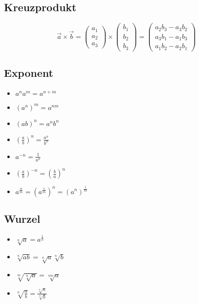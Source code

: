 \subsection{Kreuzprodukt}
{\footnotesize
\[
\vec{a} \times \vec{b} = \left ( \begin{array}{c} a_1 \\ a_2 \\ a_3 \end{array}
\right ) \times
\left ( \begin{array}{c} b_1 \\ b_2 \\ b_3 \end{array}
\right ) =
\left ( \begin{array}{c} a_2b_3 - a_3b_2 \\ a_3b_1 - a_1b_3 \\ a_1b_2 - a_2b_1
\end{array} \right )
\]
}

\begin{multicols}{2}
\subsection{Exponent}
\begin{itemize}[leftmargin=*]
  \item $a^n a^m = a^{n + m}$
  \item $(a^n)^m = a^{nm}$
  \item $(ab)^n = a^n b^n$
  \item $\left( \frac{a}{b} \right)^n = \frac{a^n}{b^n}$
  \item $a^{-n} = \frac{1}{a^n}$
  \item $\left( \frac{a}{b} \right)^{-n} = \left( \frac{b}{a} \right)^n$
  \item $a^\frac{n}{m} = (a^\frac{1}{m})^n = (a^n)^\frac{1}{m}$
\end{itemize}
\columnbreak

\subsection{Wurzel}
\begin{itemize}[leftmargin=*]
  \item $\sqrt[n]{a} = a^\frac{1}{n}$
  \item $\sqrt[n]{ab} = \sqrt[n]{a} \sqrt[n]{b}$
  \item $\sqrt[m]{\sqrt[n]{a}} = \sqrt[nm]{a}$
  \item $\sqrt[n]{\frac{a}{b}} = \frac{\sqrt[n]{a}}{\sqrt[n]{b}}$
\end{itemize}

\end{multicols}

